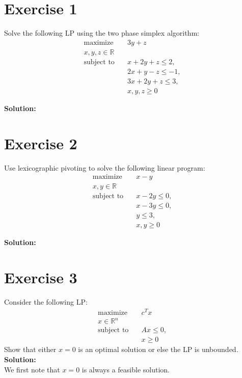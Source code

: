 \documentclass{article}
\begin{document}
\section*{Exercise 1}
Solve the following LP using the two phase simplex algorithm:
\begin{align*}
\text{maximize} \quad & 3y + z \\
x, y, z \in \mathbb{R} & \\
\text{subject to} \quad & x + 2y + z \leq 2, \\
& 2x + y - z \leq -1, \\
& 3x + 2y + z \leq 3, \\
& x, y, z \geq 0
\end{align*}

\textbf{Solution:} \\

\newpage

\section*{Exercise 2}
Use lexicographic pivoting to solve the following linear program:
\begin{align*}
\text{maximize} \quad & x - y \\
x, y \in \mathbb{R} & \\
\text{subject to} \quad & x - 2y \leq 0, \\
& x - 3y \leq 0, \\
& y \leq 3, \\
& x, y \geq 0
\end{align*}

\textbf{Solution:}

\newpage

\section*{Exercise 3}
Consider the following LP:
\begin{align*}
\text{maximize} \quad & c^T x \\
x \in \mathbb{R}^n & \\
\text{subject to} \quad & Ax \leq 0, \\
& x \geq 0
\end{align*}
Show that either $x = 0$ is an optimal solution or else the LP is unbounded. \\

\textbf{Solution:} \\

We first note that $x = 0$ is always a feasible solution. \\
\end{document}
